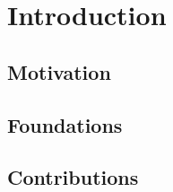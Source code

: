 \chapter{Introduction}
\minitocsection 
\kant
\section{Motivation}
\kant
\section{Foundations}
\kant
\section{Contributions}
\kant